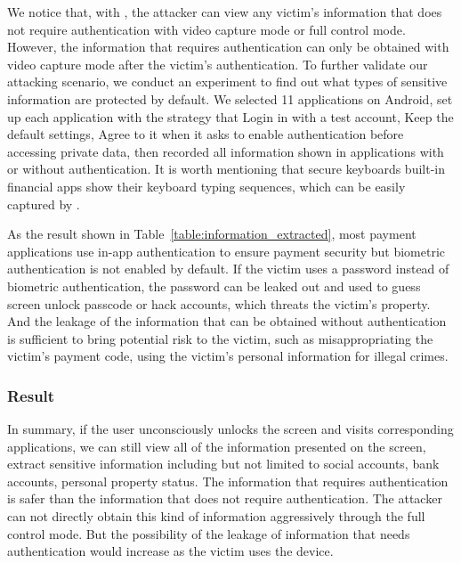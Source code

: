 

We notice that, with \tool, the attacker can view any victim's information that does not require authentication with video capture mode or full control mode.
However, the information that requires authentication can only be obtained with video capture mode after the victim's authentication.
To further validate our attacking scenario, we conduct an experiment to find out what types of sensitive information are protected by default. We selected 11 applications on Android, set up each application with the strategy that
 Login in with a test account,
 Keep the default settings,
 Agree to it when it asks to enable authentication before accessing private data,
then recorded all information shown in applications with or without authentication.
It is worth mentioning that {secure keyboards} built-in financial apps show their keyboard typing sequences, which can be easily captured by \tool.


As the result shown in Table~\ref{table:information_extracted}, most payment applications use in-app authentication to ensure payment security but biometric authentication is not enabled by default. If the victim uses a password instead of biometric authentication, the password can be leaked out and used to guess screen unlock passcode or hack accounts, which threats the victim's property.
And the leakage of the information that can be obtained without authentication is sufficient to bring potential risk to the victim, such as misappropriating the victim's payment code, using the victim's personal information for illegal crimes.


\subsubsection{Result}

In summary, if the user unconsciously unlocks the screen and visits corresponding applications, we can still view all of the information presented on the screen, extract sensitive information including but not limited to social accounts, bank accounts, personal property status.
The information that requires authentication is safer than the information that does not require authentication. The attacker can not directly obtain this kind of information aggressively through the full control mode. But the possibility of the leakage of information that needs authentication would increase as the victim uses the device.

